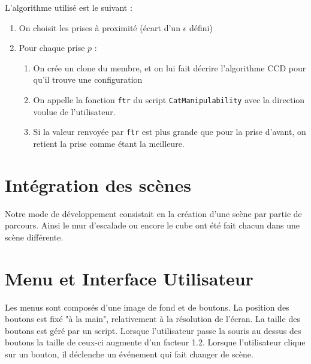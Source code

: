 \documentclass[a4paper,11pt]{article}
\begin{document}
L'algorithme utilisé est le suivant : 
\begin{enumerate}
\item On choisit les prises à proximité (écart d'un $\epsilon$ défini)
\item Pour chaque prise $p$ : 
\begin{enumerate}
\item On crée un clone du membre, et on lui fait décrire l'algorithme CCD pour qu'il trouve une configuration
\item On appelle la fonction \texttt{ftr} du script \texttt{CatManipulability} avec la direction voulue de l'utilisateur. 
\item Si la valeur renvoyée par \texttt{ftr} est plus grande que pour la prise d'avant, on retient la prise comme étant la meilleure.
\end{enumerate}
\end{enumerate}


\section{Intégration des scènes}
Notre mode de développement consistait en la création d’une scène par partie de parcours. Ainsi le mur d’escalade ou encore le cube ont été fait chacun dans une scène différente. 

\section{Menu et Interface Utilisateur}

Les menus sont composés d'une image de fond et de boutons. La position des boutons est fixé "à la main", relativement à la résolution de l'écran. La taille des boutons est géré par un script. Lorsque l'utilisateur passe la souris au dessus des boutons la taille de ceux-ci augmente d'un facteur 1.2. Lorsque l'utilisateur clique sur un bouton, il déclenche un événement qui fait changer de scène.
\end{document}
